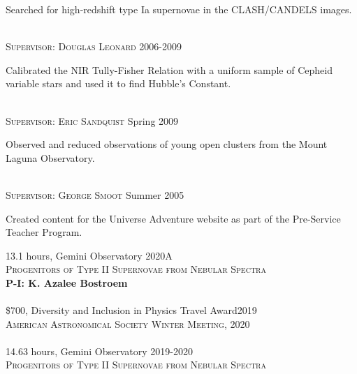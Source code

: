 \documentclass[10pt]{cv}
\begin{document}
\begin{llist}
\begin{minipage}[l]{0.7\textwidth}
Searched for high-redshift type Ia supernovae in the CLASH/CANDELS images.\\
\end{minipage}
\\
\textsc{Supervisor: Douglas Leonard} \hfill 2006-2009 \\
\begin{minipage}[l]{0.7\textwidth}\vspace{0.15cm}
Calibrated the NIR Tully-Fisher Relation with a uniform sample of Cepheid variable stars and used it to find Hubble's Constant.\\
\end{minipage}
\\
\textsc{Supervisor: Eric Sandquist} \hfill Spring 2009\\
\begin{minipage}[l]{0.7\textwidth}\vspace{0.15cm}
Observed and reduced observations of young open clusters from the Mount Laguna Observatory. \\ 
\end{minipage}
\\
\textsc{Supervisor: George Smoot} \hfill Summer 2005\\
\begin{minipage}[l]{0.7\textwidth}\vspace{0.15cm}
Created content for the Universe Adventure website as part of the 
Pre-Service Teacher Program.\\
\end{minipage}
\vspace{-0.1in}
13.1 hours, Gemini Observatory \hfill 2020A\\
\textsc{Progenitors of Type II Supernovae from Nebular Spectra}\\
\textbf{P-I: K. Azalee Bostroem}\\
\\   
\$700, Diversity and Inclusion in Physics Travel Award\hfill 2019\\
\textsc{American Astronomical Society Winter Meeting, 2020}\\
\\
14.63 hours, Gemini Observatory \hfill 2019-2020\\
\textsc{Progenitors of Type II Supernovae from Nebular Spectra}\\

\end{llist}
\end{document}
